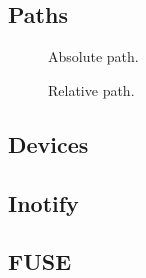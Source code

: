 
\subsection{Paths}


\begin{figure}[tbp]
  \begin{center}
  \end{center}
  \caption{Absolute path.}
  \label{fig:topics:fs:path:abs}
\end{figure}


\begin{figure}[tbp]
  \begin{center}
  \end{center}
  \caption{Relative path.}
  \label{fig:topics:fs:path:rel}
\end{figure}


\subsection{Devices}



\subsection{Inotify}



\subsection{FUSE}

